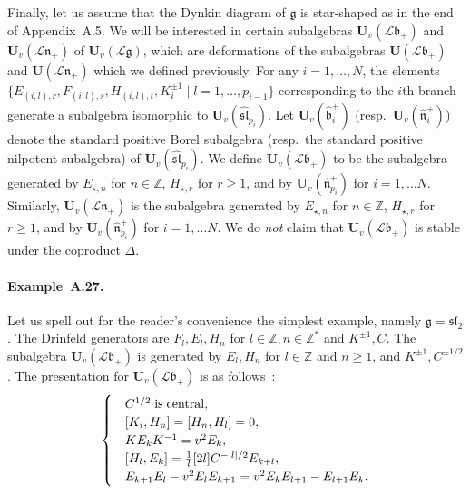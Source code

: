 \documentclass[a4paper,10pt]{amsart}
\def\Z{\mathbb{Z}}
\def\U{\mathbf{U}}
\def\g{\mathfrak{g}}
\def\bo{\mathfrak{b}}
\def\n{\mathfrak{n}}
\numberwithin{equation}{section}
\begin{document}
{\vspace{.2in}

Finally, let us assume that the Dynkin diagram of $\g$ is star-shaped as in the end of Appendix~A.5.
We will be interested in certain subalgebras $\U_{v}(\mathcal{L}\bo_+)$ and $\U_{v}(\mathcal{L}\n_+)$ of $\U_{v}(\mathcal{L}\g)$, which are deformations of the subalgebras $\U(\mathcal{L}\bo_+)$ and $\U(\mathcal{L}\n_+)$ which we defined previously.  For any $i=1, \ldots, N$, the elements $\{E_{(i,l),r}, F_{(i,l),s}, H_{(i,l),t}, K^{\pm 1}_{i}\;|\; l=1, \ldots, p_{i-1} \}$ corresponding to the $i$th branch generate a subalgebra isomorphic to $\U_{v}(\widehat{\mathfrak{sl}}_{p_i})$. Let $\U_{v}(\widehat{\mathfrak{b}}^+_{i})$ (resp.\ $\U_{v}(\widehat{\mathfrak{n}}^+_{i})$) denote the standard positive Borel subalgebra (resp.\ the standard positive nilpotent subalgebra) of $\U_{v}(\widehat{\mathfrak{sl}}_{p_i})$. We define $\U_{v}(\mathcal{L}\bo_+)$ to be the subalgebra generated by $E_{\star, n}$ for $n \in \Z$, $H_{\star,r}$ for $r \geq 1$, and by $\U_{v}(\widehat{\mathfrak{n}}^+_{p_i})$ for $i=1, \ldots N$. Similarly, $\U_v(\mathcal{L}\n_+)$ is the subalgebra generated by $E_{\star, n}$ for $n \in \Z$, $H_{\star,r}$ for $r \geq 1$, and by $\U_{v}(\widehat{\mathfrak{n}}^+_{p_i})$ for $i=1, \ldots N$. We do \textit{not} claim that
$\U_{v}(\mathcal{L}\bo_+)$ is stable under the coproduct $\Delta$.

\vspace{.15in}

\addtocounter{theo}{1}

\paragraph{\textbf{Example~A.27.}}  Let us spell out for the reader's convenience the simplest example, namely $\g=\mathfrak{sl}_2$. The Drinfeld generators are $F_l,E_l,H_n$ for $l \in \Z, n \in \Z^*$ and $K^{\pm 1}, C$. The subalgebra $\U_v(\mathcal{L}\bo_+)$ is generated by $E_l, H_n$ for $l \in \Z$ and $n \geq 1$, and $K^{\pm 1}, C^{\pm 1/2}$. The presentation for $\U_v(\mathcal{L}\bo_+)$ is as follows~:
\begin{equation}\label{E:Drinfeldpressl2}
\begin{cases}
&C^{1/2} \;\text{is\;central},\\
& [K_i,H_{n}]=[H_n,H_l]=0,\\
&K E_{k}K^{-1}=v^{2}E_{k},\\
&[H_{l},E_{k}]= \frac{1}{l}[2l]C^{-|l|/2}E_{k+l}, \\
&E_{k+1}E_{l}-v^{2}E_{l}E_{k+1}=
v^{2}E_{k}E_{l+1}-E_{l+1}E_{k}.
\end{cases}
\end{equation}

}
\end{document}
